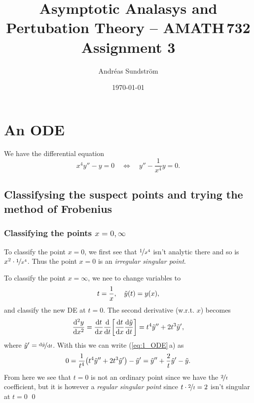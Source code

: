 \documentclass[11pt,letter, swedish, english
]{article}
\begin{document}
\title{Asymptotic Analasys and Pertubation Theory -- AMATH\,732 \\
Assignment 3}
\author{Andréas Sundström}
\date{\today}

\maketitle



\section{An ODE}
We have the differential equation
\begin{equation}\label{eq:1_ODE}
x^4y''-y=0
\quad\Longleftrightarrow\quad
y''-\frac{1}{x^4}y = 0.
\end{equation}

\subsection{Classifysing the suspect points 
  and trying the method of Frobenius} 

\subsubsection{Classifying the points $x=0, \infty$}
To classify the point $x=0$, we first see that $\nicefrac{1}{x^4}$
isn't analytic there and so is $x^2\cdot\nicefrac{1}{x^4}$. Thus the
point $x=0$ is an \emph{irregular singular point}.

To classify the point $x=\infty$, we nee to change variables to
\begin{equation}
t=\frac{1}{x}\qcomma \tilde{y}(t)=y(x),
\end{equation}
and classify the new DE at $t=0$.
The second derivative (w.r.t. $x$) becomes
\begin{equation}
\dv[2]{y}{x}=\dv{t}{x}
\dv{t}\qty[\dv{t}{x}\dv{\tilde{y}}{t}]=t^4\tilde{y}''+2t^3\tilde{y}',
\end{equation}
where $\tilde{y}'=\nicefrac{\mathrm{d}\tilde{y}}{\mathrm{d}{t}}$. With this we can
write (\ref{eq:1_ODE}\,a) as
\begin{equation}
0=\frac{1}{t^4}\qty(t^4\tilde{y}''+2t^3\tilde{y}') - \tilde{y} '
= \tilde{y}'' +\frac{2}{t}\tilde{y}' - \tilde{y}.
\end{equation}
From here we see that $t=0$ is not an ordinary point since we have the
$\nicefrac{2}{t}$ coefficient, but it is however a \emph{regular singular
point} since $t\cdot\nicefrac{2}{t}=2$ isn't singular at $t=0$
\qed
\end{document}
